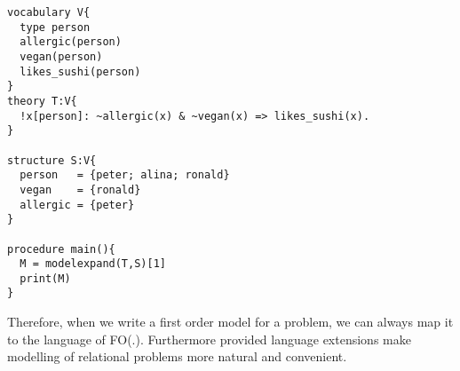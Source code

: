 \begin{minipage}{\linewidth}
\begin{lstlisting}[caption=Encoding sushi preferences problem, label=lst:idp_sushi,basicstyle=\ttfamily, basicstyle=\small]
vocabulary V{
  type person
  allergic(person)
  vegan(person)
  likes_sushi(person)
}
theory T:V{
  !x[person]: ~allergic(x) & ~vegan(x) => likes_sushi(x).
}

structure S:V{
  person   = {peter; alina; ronald}
  vegan    = {ronald}
  allergic = {peter}
}

procedure main(){
  M = modelexpand(T,S)[1]
  print(M)
}
\end{lstlisting}
\end{minipage}

Therefore, when we write a first order model for a problem, we can always map it to the language of FO(.). Furthermore provided language extensions make modelling of relational problems more natural and convenient.

